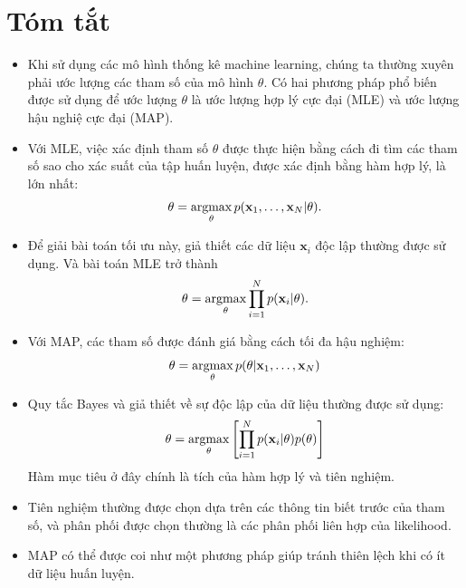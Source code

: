 \section{Tóm tắt}
\begin{itemize}
\item Khi sử dụng các mô hình thống kê machine learning, chúng ta thường
xuyên phải ước lượng các tham số của mô hình $\theta$. Có hai phương pháp phổ biến được sử dụng để
ước lượng $\theta$ là ước lượng hợp lý cực đại (MLE) và ước lượng hậu nghiệ cực đại (MAP).

\item Với MLE, việc xác định tham số $\theta$ được thực hiện bằng cách đi
tìm các tham số sao cho xác suất của tập huấn luyện, được xác định bằng
hàm {hợp lý}, là lớn nhất:
\begin{equation}
\theta = \operatorname*{argmax}_{\theta} p(\mathbf{x}_1, \dots, \mathbf{x}_N |\theta).
\end{equation}

\item Để giải bài toán tối ưu này, giả thiết các dữ liệu $\mathbf{x}_i$ độc lập thường được sử dụng. Và bài toán MLE trở thành
\begin{equation}
\theta = \operatorname*{argmax}_{\theta} \prod_{i=1}^N p(\mathbf{x}_i | \theta).
\end{equation}

\item Với MAP, các tham số được đánh giá bằng cách tối đa {hậu nghiệm}:
\begin{equation}
\theta = \operatorname*{argmax}_{\theta} p(\theta | \mathbf{x}_1, \dots, \mathbf{x}_N)
\end{equation}
\item Quy tắc Bayes và giả thiết về sự độc lập của dữ
liệu thường được sử dụng:
\begin{equation} \theta = \operatorname*{argmax}_{\theta}
\left[\prod_{i=1}^N p(\mathbf{x}_i | \theta) p(\theta) \right]
\end{equation}
Hàm mục tiêu ở đây chính là tích của {hàm hợp lý} và tiên nghiệm.


\item Tiên nghiệm thường được chọn dựa trên các thông tin biết trước của
tham số, và phân phối được chọn thường là các phân phối liên hợp của likelihood.

\item MAP có thể được coi như một phương pháp giúp tránh thiên lệch khi có
ít dữ liệu huấn luyện.

\end{itemize}




